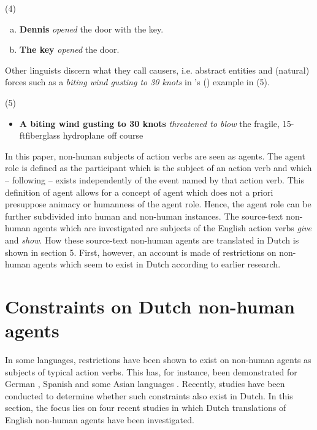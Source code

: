 \documentclass[output=paper]{LSP/langsci}
\begin{document}
\noindent(4)
\begin{enumerate}[a)]
\item \textbf{Dennis} \textit{opened} the door with the key.
\item \textbf{The key} \textit{opened} the door. 
\end{enumerate}

Other linguists \citep[see e.g.][]{Biber1999,Talmy2000} discern what they call causers, i.e. abstract entities and (natural) forces such as a \textit{biting wind gusting to 30 knots} in \citeauthor{Biber1999}’s (\citeyear{Biber1999}) example in (5).\newline  

\noindent(5)
\begin{itemize}
\item \textbf{A biting wind gusting to 30 knots} \textit{threatened to blow} the fragile, 15-ftfiberglass hydroplane off course
\end{itemize}

In this paper, non-human subjects of action verbs are seen as agents. The agent role is defined as the participant which is the subject of an action verb and which – following \citet{Dowty1991} – exists independently of the event named by that action verb. This definition of agent allows for a concept of agent which does not a priori presuppose animacy or humanness of the agent role. Hence, the agent role can be further subdivided into human and non-human instances. The source-text non-human agents which are investigated are subjects of the English action verbs \textit{give} and \textit{show}. How these source-text non-human agents are translated in Dutch is shown in section 5. First, however, an account is made of restrictions on non-human agents which seem to exist in Dutch according to earlier research.

\section{Constraints on Dutch non-human agents}
In some languages, restrictions have been shown to exist on non-human agents as subjects of typical action verbs. This has, for instance, been demonstrated for German \citep[see e.g.][]{Bahns1993}, Spanish \citep[see e.g.][]{Slabakova2002} and some Asian languages \citep[see e.g.][]{Master1991}. Recently, studies have been conducted to determine whether such constraints also exist in Dutch. In this section, the focus lies on four recent studies in which Dutch translations of English non-human agents have been investigated.
\end{document}
